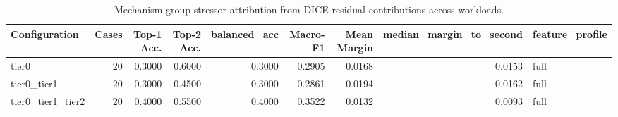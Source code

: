 \begin{table}[t]
\centering
\caption{Mechanism-group stressor attribution from DICE residual contributions across workloads.}
\label{tab:dice_stressor_diagnosis}
\footnotesize
\begin{tabular}{lrrrrrrrl}
\toprule
Configuration & Cases & Top-1 Acc. & Top-2 Acc. & balanced_acc & Macro-F1 & Mean Margin & median_margin_to_second & feature_profile \\
\midrule
tier0 & 20 & 0.3000 & 0.6000 & 0.3000 & 0.2905 & 0.0168 & 0.0153 & full \\
tier0_tier1 & 20 & 0.3000 & 0.4500 & 0.3000 & 0.2861 & 0.0194 & 0.0162 & full \\
tier0_tier1_tier2 & 20 & 0.4000 & 0.5500 & 0.4000 & 0.3522 & 0.0132 & 0.0093 & full \\
\bottomrule
\end{tabular}

\end{table}
